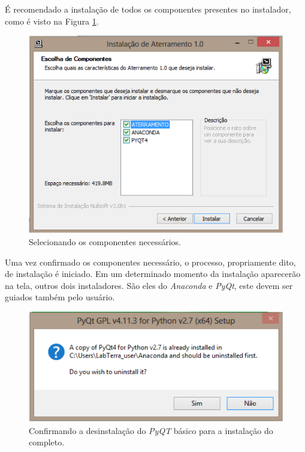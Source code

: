 \documentclass[a4paper, 10pt]{article}
\begin{document}
É recomendado a instalação  de todos os componentes presentes no instalador, como é 
visto na Figura \ref{fig_selecionando_componentes_externos}. 

\begin{figure}[!h]
        \caption{\label{fig_selecionando_componentes_externos}Selecionando os componentes necessários.}
	    \begin{center}
            \includegraphics[scale=0.7]{../fotos/instalacao/parte2_selecionando_componentes.pdf}
	    \end{center}
\end{figure}

Uma vez confirmado os componentes necessário, o processo, propriamente dito, de instalação 
é iniciado. Em um determinado momento da instalação aparecerão na tela, outros dois instaladores. 
São eles do \textit{Anaconda} e \textit{PyQt}, este devem ser guiados também pelo usuário.

\begin{figure}[!h]
    \caption{\label{fig_pyqt_antigo}Confirmando a desinstalação do \textit{PyQT} básico para a instalação do completo.}
	    \begin{center}
            \includegraphics[scale=0.6]{../fotos/instalacao/parte6_pyqt.pdf}
	    \end{center}
\end{figure}
\end{document}
